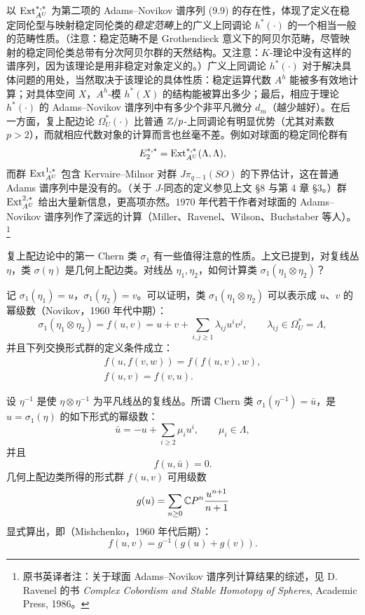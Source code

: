 以 $\operatorname{Ext}_{A^U}^{*,*}$ 为第二项的 Adams--Novikov 谱序列 (9.9) 的存在性，体现了定义在稳定同伦型与映射稳定同伦类的\emph{稳定范畴}上的广义上同调论 $h^*(\cdot)$ 的一个相当一般的范畴性质。（注意：稳定范畴不是 Grothendieck 意义下的阿贝尔范畴，尽管映射的稳定同伦类总带有分次阿贝尔群的天然结构。又注意：$K$-理论中没有这样的谱序列，因为该理论是用非稳定对象定义的。）广义上同调论 $h^*(\cdot)$ 对于解决具体问题的用处，当然取决于该理论的具体性质：稳定运算代数 $A^h$ 能被多有效地计算；对具体空间 $X$，$A^h$-模 $h^*(X)$ 的结构能被算出多少；最后，相应于理论 $h^*(\cdot)$ 的 Adams--Novikov 谱序列中有多少个非平凡微分 $d_m$（越少越好）。在后一方面，复上配边论 $\Omega_U^*(\cdot)$ 比普通 $\mathbb{Z}/p$-上同调论有明显优势（尤其对素数 $p>2$），而就相应代数对象的计算而言也丝毫不差。例如对球面的稳定同伦群有
\[
E_2^{*,*}=\operatorname{Ext}_{A^U}^{*,*}(\Lambda,\Lambda),
\]
而群 $\operatorname{Ext}_{A^U}^{1,*}$ 包含 Kervaire--Milnor 对群 $J\pi_{q-1}(SO)$ 的下界估计，这在普通 Adams 谱序列中是没有的。（关于 $J$-同态的定义参见上文 §8 与第 4 章 §3。）群 $\operatorname{Ext}_{A^U}^{2,*}$ 给出大量新信息，更高项亦然。1970 年代若干作者对球面的 Adams--Novikov 谱序列作了深远的计算（Miller、Ravenel、Wilson、Buchstaber 等人）。\footnote{原书英译者注：关于球面 Adams--Novikov 谱序列计算结果的综述，见 D. Ravenel 的书 \emph{Complex Cobordism and Stable Homotopy of Spheres}, Academic Press, 1986。}

复上配边论中的第一 Chern 类 $\sigma_1$ 有一些值得注意的性质。上文已提到，对复线丛 $\eta$，类 $\sigma(\eta)$ 是几何上配边类。对线丛 $\eta_1,\eta_2$，如何计算类 $\sigma_1(\eta_1\otimes\eta_2)$？

记 $\sigma_1(\eta_1)=u$，$\sigma_1(\eta_2)=v$。可以证明，类 $\sigma_1(\eta_1\otimes\eta_2)$ 可以表示成 $u$、$v$ 的幂级数（Novikov，1960 年代中期）：
\[
\sigma_1(\eta_1\otimes\eta_2)=f(u,v)=u+v+\sum_{i,j\ge1}\lambda_{ij}u^iv^j,\qquad \lambda_{ij}\in\Omega_U^*=\Lambda,
\]
并且下列交换形式群的定义条件成立：
\begin{equation}
\begin{gathered}
f(u,f(v,w))=f(f(u,v),w),\\
f(u,v)=f(v,u).
\end{gathered}\tag{9.10}
\end{equation}

设 $\eta^{-1}$ 是使 $\eta\otimes\eta^{-1}$ 为平凡线丛的复线丛。所谓 Chern 类 $\sigma_1(\eta^{-1})=\bar u$，是 $u=\sigma_1(\eta)$ 的如下形式的幂级数：
\[
\bar u=-u+\sum_{i\ge2}\mu_iu^i,\qquad \mu_i\in\Lambda,
\]
并且
\begin{equation}
f(u,\bar u)=0. \tag{9.11}
\end{equation}
几何上配边类所得的形式群 $f(u,v)$ 可用级数
\[
g(u)=\sum_{n\ge0}\mathbb{C}P^n\frac{u^{n+1}}{n+1}
\]
显式算出，即（Mishchenko，1960 年代后期）：
\begin{equation}
f(u,v)=g^{-1}(g(u)+g(v)). \tag{9.12}
\end{equation}

